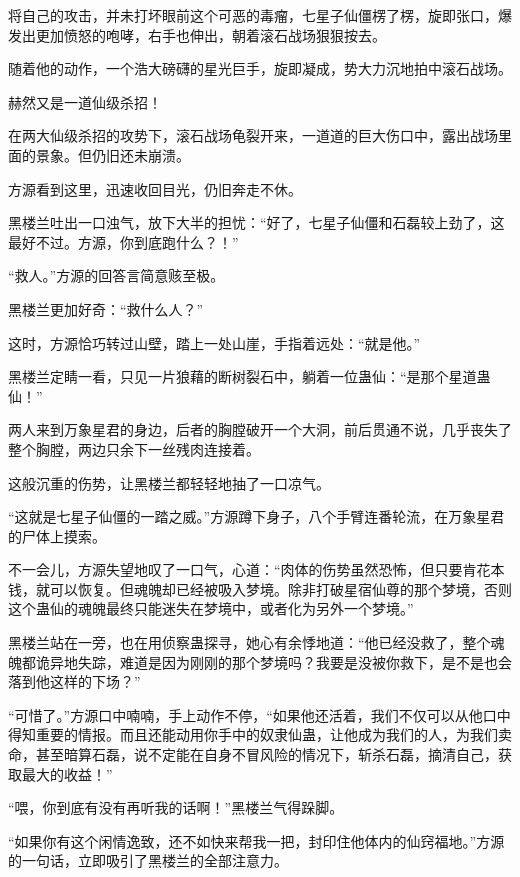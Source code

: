 
\begin{this_body}



将自己的攻击，并未打坏眼前这个可恶的毒瘤，七星子仙僵楞了楞，旋即张口，爆发出更加愤怒的咆哮，右手也伸出，朝着滚石战场狠狠按去。

随着他的动作，一个浩大磅礴的星光巨手，旋即凝成，势大力沉地拍中滚石战场。

赫然又是一道仙级杀招！

在两大仙级杀招的攻势下，滚石战场龟裂开来，一道道的巨大伤口中，露出战场里面的景象。但仍旧还未崩溃。

方源看到这里，迅速收回目光，仍旧奔走不休。

黑楼兰吐出一口浊气，放下大半的担忧：“好了，七星子仙僵和石磊较上劲了，这最好不过。方源，你到底跑什么？！”

“救人。”方源的回答言简意赅至极。

黑楼兰更加好奇：“救什么人？”

这时，方源恰巧转过山壁，踏上一处山崖，手指着远处：“就是他。”

黑楼兰定睛一看，只见一片狼藉的断树裂石中，躺着一位蛊仙：“是那个星道蛊仙！”

两人来到万象星君的身边，后者的胸膛破开一个大洞，前后贯通不说，几乎丧失了整个胸膛，两边只余下一丝残肉连接着。

这般沉重的伤势，让黑楼兰都轻轻地抽了一口凉气。

“这就是七星子仙僵的一踏之威。”方源蹲下身子，八个手臂连番轮流，在万象星君的尸体上摸索。

不一会儿，方源失望地叹了一口气，心道：“肉体的伤势虽然恐怖，但只要肯花本钱，就可以恢复。但魂魄却已经被吸入梦境。除非打破星宿仙尊的那个梦境，否则这个蛊仙的魂魄最终只能迷失在梦境中，或者化为另外一个梦境。”

黑楼兰站在一旁，也在用侦察蛊探寻，她心有余悸地道：“他已经没救了，整个魂魄都诡异地失踪，难道是因为刚刚的那个梦境吗？我要是没被你救下，是不是也会落到他这样的下场？”

“可惜了。”方源口中喃喃，手上动作不停，“如果他还活着，我们不仅可以从他口中得知重要的情报。而且还能动用你手中的奴隶仙蛊，让他成为我们的人，为我们卖命，甚至暗算石磊，说不定能在自身不冒风险的情况下，斩杀石磊，摘清自己，获取最大的收益！”

“喂，你到底有没有再听我的话啊！”黑楼兰气得跺脚。

“如果你有这个闲情逸致，还不如快来帮我一把，封印住他体内的仙窍福地。”方源的一句话，立即吸引了黑楼兰的全部注意力。


\end{this_body}
